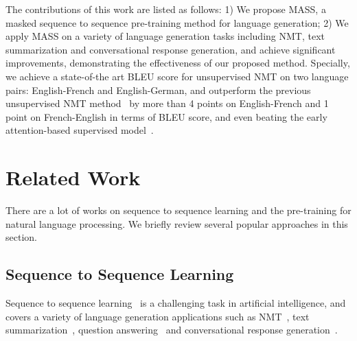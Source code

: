 \documentclass{article}
\begin{document}
	The contributions of this work are listed as follows: 1) We propose MASS, a  masked sequence to sequence pre-training method for language generation; 2) We apply MASS on a variety of language generation tasks including NMT, text summarization and conversational response generation, and achieve significant improvements, demonstrating the effectiveness of our proposed method. Specially, we achieve a state-of-the art BLEU score for unsupervised NMT on two language pairs: English-French and English-German, and outperform the previous unsupervised NMT method~\citep{Lample2019MLM} by more than 4 points on English-French and 1 point on French-English in terms of BLEU score, and even beating the early attention-based supervised model~\citep{bahdanau2015neural}. 
	
	




	










	
	
	


	
	\section{Related Work}
	There are a lot of works on sequence to sequence learning and the pre-training for natural language processing. We briefly review several popular approaches in this section. 
	
	\subsection{Sequence to Sequence Learning}
	Sequence to sequence learning~\citep{DBLP:conf/emnlp/ChoMGBBSB14,DBLP:journals/corr/BahdanauCB14,DBLP:journals/corr/WuSCLNMKCGMKSJL16,Jonas2017ConvS2S,DBLP:conf/nips/VaswaniSPUJGKP17} is a challenging task in artificial intelligence, and covers a variety of language generation applications such as NMT~\citep{DBLP:conf/emnlp/ChoMGBBSB14,DBLP:journals/corr/BahdanauCB14,DBLP:journals/corr/WuSCLNMKCGMKSJL16,Jonas2017ConvS2S,DBLP:conf/nips/VaswaniSPUJGKP17,tan2018multilingual,artetxe2017unsupervised,lample2017unsupervised,DBLP:conf/emnlp/LampleOCDR18,he2018layer,hassan2018achieving,song-etal-2018-double,shen-etal-2018-dense}, text summarization~\citep{Shen2016summarization,Suzuki2017summarization,Jonas2017ConvS2S}, question answering~\citep{yuan2017machine,46657} and conversational response generation~\citep{shang2015neural,DBLP:journals/corr/VinyalsL15}. 
	
\end{document}
